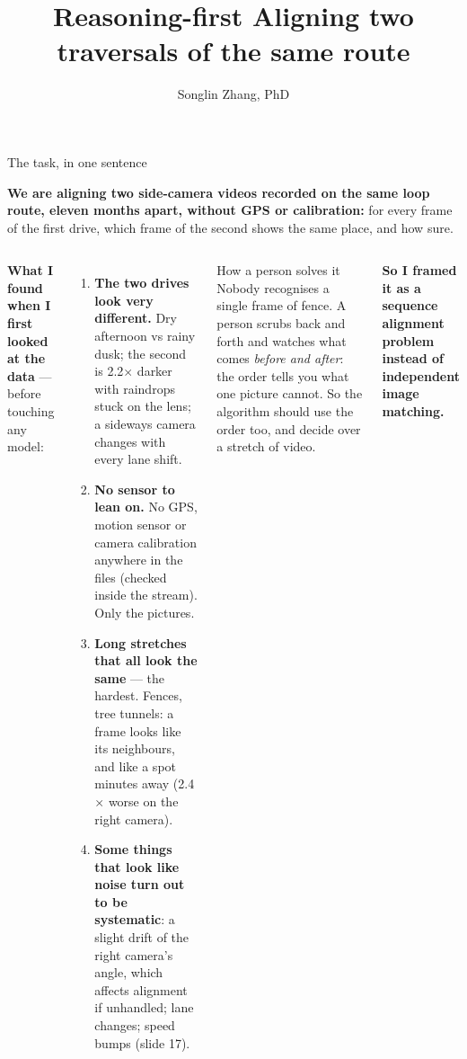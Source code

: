 \documentclass[10pt,aspectratio=169]{beamer}
\title{Reasoning-first Aligning two traversals of the same route}
\author{Songlin Zhang, PhD}
\date{}
\begin{document}
\maketitle

\begin{frame}{The task, in one sentence}
\begin{center}
\colorbox{teal!10}{\parbox{0.94\textwidth}{\centering\scriptsize
\textbf{We are aligning two side-camera videos recorded on the same loop route, eleven months apart, without GPS or calibration:} for every frame of the first drive, which frame of the second shows the same place, and how sure.}}
\end{center}
\footnotesize
\begin{columns}[T]
\textbf{What I found when I first looked at the data} --- before touching any model:
\begin{enumerate}
  \item \textbf{The two drives look very different.} Dry afternoon vs rainy dusk; the second is 2.2$\times$ darker with raindrops stuck on the lens; a sideways camera changes with every lane shift.
  \item \textbf{No sensor to lean on.} No GPS, motion sensor or camera calibration anywhere in the files (checked inside the stream). Only the pictures.
  \item \textbf{Long stretches that all look the same} --- the hardest. Fences, tree tunnels: a frame looks like its neighbours, and like a spot minutes away (2.4$\times$ worse on the right camera).
  \item \textbf{Some things that look like noise turn out to be systematic}: a slight drift of the right camera's angle, which affects alignment if unhandled; lane changes; speed bumps (slide 17).
\end{enumerate}
\vspace{-4pt}
\begin{block}{How a person solves it}
Nobody recognises a single frame of fence. A person scrubs back and forth and watches what comes \emph{before and after}: the order tells you what one picture cannot. So the algorithm should use the order too, and decide over a stretch of video.
\end{block}
\vspace{2pt}
\begin{center}
\colorbox{teal!10}{\parbox{0.96\linewidth}{\centering\footnotesize\textbf{So I framed it as a sequence alignment problem instead of independent image matching.}}}
\end{center}
\end{columns}
\end{frame}
\end{document}

